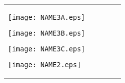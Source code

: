 \documentclass{minimal}
\begin{document}
\begin{tabular}{lllll}
	\begin{minipage}[t][][b]{0.252\textwidth} {\centering \texttt{[image: NAME3A.eps]}} \end{minipage} 
	\begin{minipage}[t][][b]{0.005\textwidth} {} \end{minipage} 
	\begin{minipage}[t][][b]{0.255\textwidth} {\centering \texttt{[image: NAME3B.eps]}} \end{minipage} 
	\begin{minipage}[t][][b]{0.250\textwidth} {\centering \texttt{[image: NAME3C.eps]}} \end{minipage} 
	\begin{minipage}[t][][b]{0.250\textwidth} {\centering \texttt{[image: NAME2.eps]}} \end{minipage} 
\end{tabular}
\end{document}
